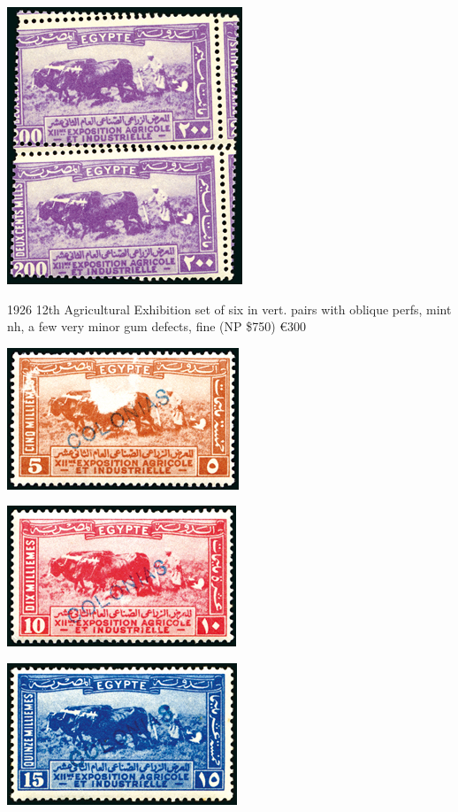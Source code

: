 \documentclass[justified]{tufte-book}
\begin{document}
\begin{center}
\includegraphics[scale=0.8]{./graphics/EG/SG131-oblique}
\end{center}
\medskip

1926 12th Agricultural Exhibition set of six in vert. pairs with oblique perfs, mint nh, a few very minor gum defects, fine (NP \$750) \euro300

\includegraphics[scale=0.8]{./graphics/EG/SG126-colonias} 
\smallskip

\includegraphics[scale=0.8]{./graphics/EG/SG127-colonias}
\smallskip

\includegraphics[scale=0.8]{./graphics/EG/SG128-colonias} 
\smallskip
\end{document}
